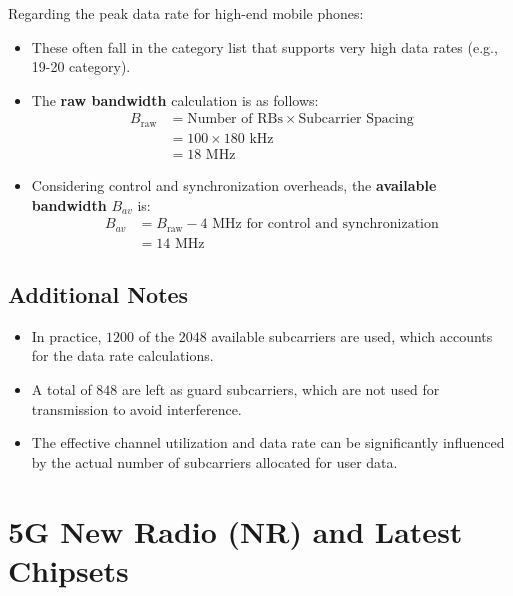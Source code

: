 Regarding the peak data rate for high-end mobile phones:
\begin{itemize}
    \item These often fall in the category list that supports very high data rates (e.g., 19-20 category).
    \item The \textbf{raw bandwidth} calculation is as follows:
          \begin{align*}
              B_{\text{raw}} &= \text{Number of RBs} \times \text{Subcarrier Spacing} \\
                             &= 100 \times 180\text{ kHz} \\
                             &= 18\text{ MHz}
          \end{align*}
    \item Considering control and synchronization overheads, the \textbf{available bandwidth} \(B_{av}\) is:
          \begin{align*}
              B_{av} &= B_{\text{raw}} - 4\text{ MHz for control and synchronization} \\
                     &= 14\text{ MHz}
          \end{align*}
\end{itemize}

\subsection*{Additional Notes}

\begin{itemize}
    \item In practice, \(1200\) of the \(2048\) available subcarriers are used, which accounts for the data rate calculations.
    \item A total of \(848\) are left as guard subcarriers, which are not used for transmission to avoid interference.
    \item The effective channel utilization and data rate can be significantly influenced by the actual number of subcarriers allocated for user data.
\end{itemize}








\section*{5G New Radio (NR) and Latest Chipsets}

